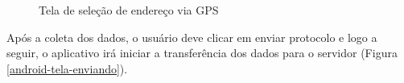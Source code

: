 \documentclass[
	article,			%
	11pt,				%
	oneside,			%
	a4paper,			%
	english,			%
	brazil,				%
	sumario=tradicional
	]{abntex2}
\begin{document}
\begin{figure}[!htbp]
\begin{minipage}{0.4\textwidth}
    \caption{\label{android-tela-gps}Tela de seleção de endereço via GPS}
  \end{minipage}
\end{figure}


Após a coleta dos dados, o usuário deve clicar em enviar protocolo e logo a seguir, o aplicativo irá iniciar a transferência dos dados para o servidor (Figura \ref{android-tela-enviando}).
\end{document}
